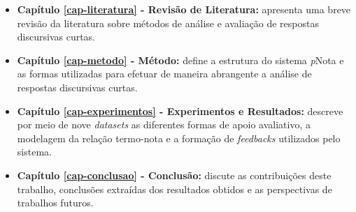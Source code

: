 \begin{itemize}
\item \textbf{Capítulo \ref{cap-literatura} - Revisão de Literatura:} apresenta uma breve revisão da literatura sobre métodos de análise e avaliação de respostas discursivas curtas.

\item \textbf{Capítulo \ref{cap-metodo} - Método:} define a estrutura do sistema \textit{p}Nota e as formas utilizadas para efetuar de maneira abrangente a análise de respostas discursivas curtas.

\item \textbf{Capítulo \ref{cap-experimentos} - Experimentos e Resultados:} descreve por meio de nove \textit{datasets} as diferentes formas de apoio avaliativo, a modelagem da relação termo-nota e a formação de \textit{feedbacks} utilizados pelo sistema.

\item \textbf{Capítulo \ref{cap-conclusao} - Conclusão:} discute as contribuições deste trabalho, conclusões extraídas dos resultados obtidos e as perspectivas de trabalhos futuros.

\end{itemize}
